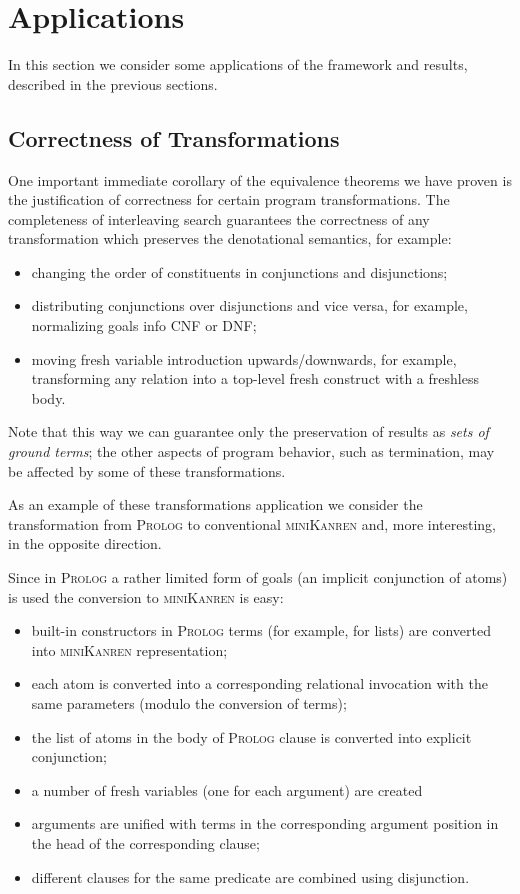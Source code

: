 \section{Applications}
\label{applications}

In this section we consider some applications of the framework and results, described in the previous sections.

\subsection{Correctness of Transformations}

One important immediate corollary of the equivalence theorems we have proven is the justification of correctness for certain program transformations.
The completeness of interleaving search guarantees the correctness of any transformation which preserves the denotational semantics,
for example:

\begin{itemize}
\item changing the order of constituents in conjunctions and disjunctions;
\item distributing conjunctions over disjunctions and vice versa, for example, normalizing goals info CNF or DNF;
\item moving fresh variable introduction upwards/downwards, for example, transforming any relation into a top-level fresh
  construct with a freshless body.
\end{itemize}

Note that this way we can guarantee only the preservation of results as \emph{sets of ground terms}; the other aspects of program behavior,
such as termination, may be affected by some of these transformations. 

As an example of these transformations application we consider the transformation from \textsc{Prolog} to conventional \textsc{miniKanren} and,
more interesting, in the opposite direction.

Since in \textsc{Prolog} a rather limited form of goals (an implicit conjunction of atoms) is used the conversion to \textsc{miniKanren} is easy:

\begin{itemize}
  \item built-in constructors in \textsc{Prolog} terms (for example, for lists) are converted into \textsc{miniKanren} representation;
  \item each atom is converted into a corresponding relational invocation with the same parameters (modulo the conversion of terms);
  \item the list of atoms in the body of \textsc{Prolog} clause is converted into explicit conjunction;
  \item a number of fresh variables (one for each argument) are created
  \item arguments are unified with terms in the corresponding
    argument position in the head of the corresponding clause;
  \item different clauses for the same predicate are combined using disjunction.
\end{itemize}

